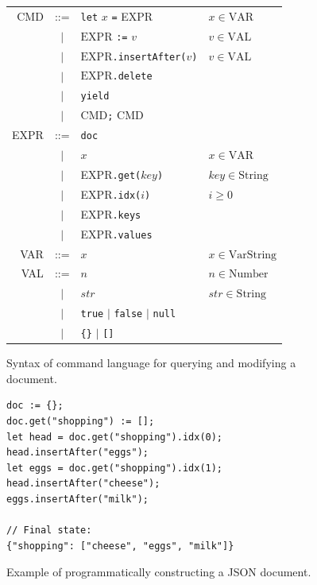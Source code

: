 \documentclass[10pt,journal,compsoc]{IEEEtran}
\begin{document}
\begin{figure}
\centering
\begin{tabular}{rcll}
CMD & ::= & \texttt{let} $x$ \texttt{=} EXPR & $x \in \mathrm{VAR}$ \\
& $|$ & $\mathrm{EXPR}$ \texttt{:=} $v$ & $v \in \mathrm{VAL}$ \\
& $|$ & $\mathrm{EXPR}$\texttt{.insertAfter(}$v$\texttt{)} & $v \in \mathrm{VAL}$ \\
& $|$ & $\mathrm{EXPR}$\texttt{.delete} \\
& $|$ & \texttt{yield} \\
& $|$ & CMD\texttt{;} CMD \vspace{0.5em}\\
EXPR & ::= & \texttt{doc} \\
& $|$ & $x$ & $x \in \mathrm{VAR}$ \\
& $|$ & EXPR\texttt{.get(}$\mathit{key}$\texttt{)} & $\mathit{key} \in \mathrm{String}$ \\
& $|$ & EXPR\texttt{.idx(}$i$\texttt{)} & $i \ge 0$ \\
& $|$ & EXPR\texttt{.keys} \\
& $|$ & EXPR\texttt{.values} \vspace{0.5em}\\
VAR & ::= & $x$ & $x \in \mathrm{VarString}$\\
VAL & ::= & $n$ & $n \in \mathrm{Number}$ \\
& $|$ & $\mathit{str}$ & $\mathit{str} \in \mathrm{String}$ \\
& $|$ & \texttt{true} $|$ \texttt{false} $|$ \texttt{null} \\
& $|$ & \verb|{}| $|$ \verb|[]|
\end{tabular}
\caption{Syntax of command language for querying and modifying a document.}\label{fig:local-syntax}
\end{figure}

\begin{figure}
\centering
\begin{verbatim}
doc := {};
doc.get("shopping") := [];
let head = doc.get("shopping").idx(0);
head.insertAfter("eggs");
let eggs = doc.get("shopping").idx(1);
head.insertAfter("cheese");
eggs.insertAfter("milk");

// Final state:
{"shopping": ["cheese", "eggs", "milk"]}
\end{verbatim}
\caption{Example of programmatically constructing a JSON document.}\label{fig:make-doc}
\end{figure}
\end{document}
